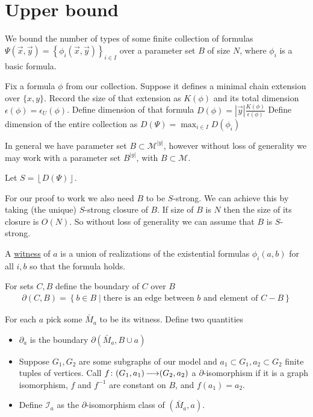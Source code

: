 \documentclass{amsart}
\newcommand{\II}{\mathscr I}
\newcommand{\MM}{\mathscr M}
\newcommand{\defn}{\underline}
\newcommand{\curly}[1]{\left\{#1\right\}}
\providecommand{\floor}[1]{\left \lfloor #1 \right \rfloor }
\begin{document}
\section{Upper bound}

We bound the number of types of some finite collection of formulas $\Psi(\vec x, \vec y) = \curly{\phi_i(\vec x, \vec y)}_{i\in I}$ over a parameter set $B$ of size $N$,
where $\phi_i$ is a basic formula.

Fix a formula $\phi$ from our collection.
Suppose it defines a minimal chain extension over $\{x, y\}$. 
Record the size of that extension as $K(\phi)$ and its total dimension $\epsilon(\phi) = \epsilon_U(\phi)$.
Define dimension of that formula $D(\phi) = |\vec y| \frac{K(\phi)}{\epsilon(\phi)}$
Define dimension of the entire collection as $D(\Psi) = \max_{i \in I} D(\phi_i)$

In general we have parameter set $B \subset \MM^{|y|}$, however without loss of generality we may work with
a parameter set $B^{|y|}$, with $B \subset \MM$.

Let $S = \floor{D(\Psi)}$.

For our proof to work we also need $B$ to be $S$-strong.
We can achieve this by taking (the unique) $S$-strong closure of $B$.
If size of $B$ is $N$ then the size of its closure is $O(N)$.	%
So without loss of generality we can assume that $B$ is $S$-strong.

\begin{Definition}
  A \defn{witness} of $a$ is a union of realizations of the existential formulas $\phi_i(a, b)$ for all $i, b$ so that the formula holds.
\end{Definition}

\begin{Definition}
  For sets $C, B$ define the boundary of $C$ over $B$
  \begin{align*}
    \partial(C, B) = \curly{b \in B \mid \text{there is an edge between $b$ and element of $C - B$}}
  \end{align*}
\end{Definition}

\begin{Definition}
  For each $a$ pick some $\bar M_a$ to be its witness.
  Define two quantities
  \begin{itemize}
  \item $\partial_a$ is the boundary $\partial(\bar M_a, B \cup a)$
  \item Suppose $G_1, G_2$ are some subgraphs of our model and $a_1 \subset G_1, a_2 \subset G_2$ finite tuples of vertices.
    Call $f \colon (G_1, a_1) \operatorname{\longrightarrow} (G_2, a_2)$ a $\partial$-isomorphism if it is a graph isomorphism,
    $f$ and $f^{-1}$ are constant on $B$, and
    $f(a_1) = a_2$.
  \item Define $\II_a$ as the $\partial$-isomorphism class of $(\bar M_a, a)$.
  \end{itemize}
\end{Definition}
\end{document}
